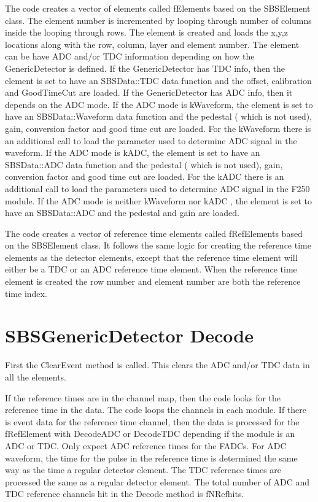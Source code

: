 \documentclass[11pt]{article}
\begin{document}
The code creates a vector of elements called fElements based on the SBSElement class.
The element number is incremented
by looping through  number of columns inside the looping through rows.
The element is created and loads the x,y,z locations along with the row, column, layer and element number.
The element can be have ADC and/or TDC information depending on how the GenericDetector is defined.
If the GenericDetector has TDC info, then the element is set to have an SBSData::TDC data function and
 the offset, calibration and GoodTimeCut are loaded.
If the GenericDetector has ADC info, then it depends on the ADC mode.
If the ADC mode is kWaveform, the element is set to have an SBSData::Waveform data function and
the pedestal ( which is not used), gain, conversion factor and good time cut are loaded. For the kWaveform
there is an additional call to load the parameter used to determine ADC signal in the waveform.
If the ADC mode is kADC, the element is set to have an SBSData::ADC data function and
the pedestal ( which is not used), gain, conversion factor and good time cut are loaded. For the kADC
there is an additional call to load the parameters used to determine ADC signal in the F250 module.
If the ADC mode is neither kWaveform nor kADC , the element is set to have an SBSData::ADC and the
pedestal and gain are loaded.
   

The code creates a vector of reference time elements called fRefElements based on the SBSElement class.
It follows the same logic for creating the reference time elements as the detector elements, 
except that the reference time element will either be a TDC or an ADC reference time element.
When the reference time element is created the row number and element number are both
 the reference time index.
 
 






\section{SBSGenericDetector Decode}

First the ClearEvent method is called. This clears the ADC and/or  TDC data  in all the elements.

If the reference times are in the channel map, then the code looks for the reference time in the data.
The code loops the channels in each module. If there is event data for the reference time channel,
then the data is processed for the fRefElement with DecodeADC or DecodeTDC depending if the module is an ADC or TDC.
Only expect ADC reference times for the FADCs. For ADC waveform, the time for the pulse in 
the reference time is determined the same way as the time a regular detector element.
The TDC reference times are processed the same as a regular detector element.
The total number of  ADC and TDC reference channels hit in the Decode method is fNRefhits.
\end{document}
